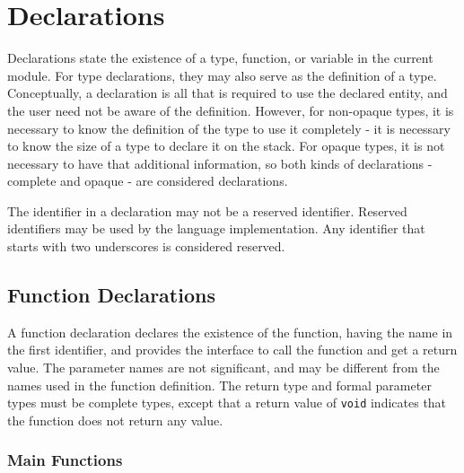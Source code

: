 \documentclass[letterpaper,12pt]{book}
\begin{document}
\chapter{Declarations}



Declarations state the existence of a type, function, or variable in the current module. For type declarations, they may also serve as the definition of a type. Conceptually, a declaration is all that is required to use the declared entity, and the user need not be aware of the definition. However, for non-opaque types, it is necessary to know the definition of the type to use it completely - it is necessary to know the size of a type to declare it on the stack. For opaque types, it is not necessary to have that additional information, so both kinds of declarations - complete and opaque - are considered declarations.

The identifier in a declaration may not be a reserved identifier. Reserved identifiers may be used by the language implementation. Any identifier that starts with two underscores is considered reserved.

\section{Function Declarations}



A function declaration declares the existence of the function, having the name in the first identifier, and provides the interface to call the function and get a return value. The parameter names are not significant, and may be different from the names used in the function definition. The return type and formal parameter types must be complete types, except that a return value of \texttt{void} indicates that the function does not return any value.

\subsection{Main Functions}\label{subsection:Main Functions}
\end{document}
